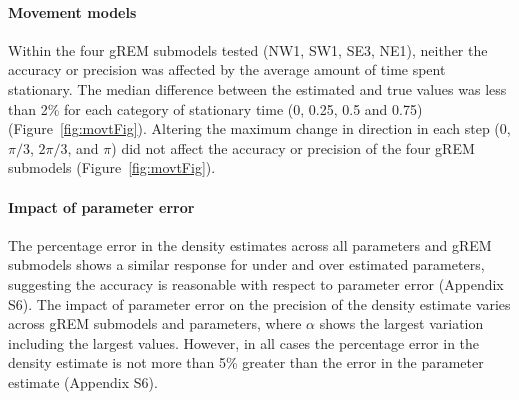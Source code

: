 
\paragraph{Movement models}

Within the four gREM submodels tested (NW1, SW1, SE3, NE1), neither the accuracy or precision was affected by the average amount of time spent stationary.
The median difference between the estimated and true values was less than 2\% for each category of stationary time (0, 0.25, 0.5 and 0.75) (Figure~\ref{fig:movtFig}).
Altering the maximum change in direction in each step (0, $\pi/3$, $2\pi/3$, and $\pi$) did not affect the accuracy or precision of the four gREM submodels (Figure~\ref{fig:movtFig}). 

\paragraph{Impact of parameter error}

The percentage error in the density estimates across all parameters and gREM submodels shows a similar response for under and over estimated parameters, suggesting the accuracy is reasonable with respect to parameter error (Appendix S6).
The impact of parameter error on the precision of the density estimate varies across gREM submodels and parameters, where $\alpha$ shows the largest variation including the largest values.
However, in all cases the percentage error in the density estimate is not more than 5\% greater than the error in the parameter estimate (Appendix S6).




